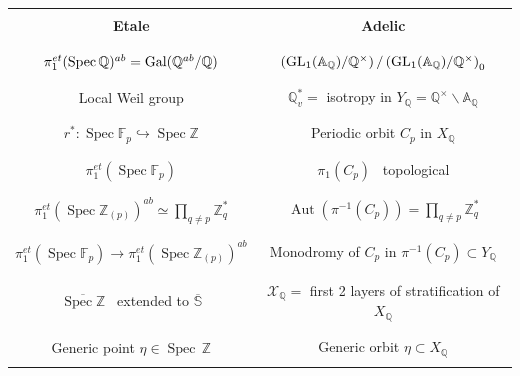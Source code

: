 \documentclass[letterpaper,11pt]{article}
\def\A{{\mathbb A}}
\def\Q{{\mathbb Q}}
\def\Z{\mathbb{Z}}
\theoremstyle{plain}
\begin{document}
\begin{center}
\renewcommand{\arraystretch}{0.5}
 \begin{tabular}{c|c}
& \\ \textbf{Etale} & \textbf{Adelic} \\
& \\ 
\hline 
& \\$\pi_1^{et}(\operatorname{Spec}\Q)^{ab}={\rm Gal}(\Q^{ab}/\Q)$  & $\left({\rm GL}_1(\A_\Q)/\Q^\times\right)/\left({\rm GL}_1(\A_\Q)/\Q^\times\right)_0$ \\
& \\ 
& \\ Local  Weil group  & $\Q_v^*=$  isotropy  in $Y_\Q=\Q^\times\backslash\A_\Q$  \\
& \\
& \\ $r^*: \operatorname{Spec} \mathbb{F}_p \hookrightarrow \operatorname{Spec} \mathbb{Z}$ & Periodic orbit $C_p$ in $X_\Q$ \\ & \\
& \\ $\pi_1^{e t}\left(\operatorname{Spec} \mathbb{F}_p\right)$ &  $\pi_1(C_p)$~ topological\\ & \\ 
& \\ $\pi_1^{e t}(\operatorname{Spec} \mathbb{Z}_{(p)})^{a b}\simeq \prod_{q\neq p} \mathbb{Z}_q^*$ & $\operatorname{Aut}(\pi^{-1}(C_p))=\prod_{q\neq p} \mathbb{Z}_q^*$  \\
 & \\ 
 & \\ $\pi_1^{e t}\left(\operatorname{Spec} \mathbb{F}_p\right)\to\pi_1^{e t}(\operatorname{Spec} \mathbb{Z}_{(p)})^{a b}$ & Monodromy of $C_p$ in $\pi^{-1}(C_p)\subset Y_\Q$\\
& \\
& \\ $\overline{\operatorname{Spec}\Z}$ ~extended to $\overline{\mathbb S}$  & ${\mathcal X}_\Q=$ first 2 layers of stratification of $X_\Q$\\
& \\
& \\ Generic point $\eta\in \operatorname{Spec}\,\Z$ & Generic orbit $\eta\subset X_\Q$ \\
& \\
\end{tabular}\end{center}
\vspace{0.3in}
\end{document}
